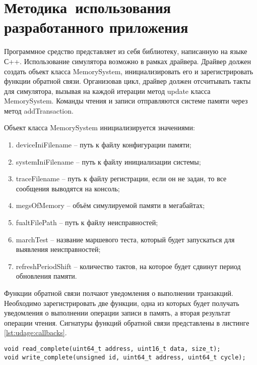 \section{Методика~использования\\ разработанного приложения}
\label{sec:usage}

Программное средство представляет из себя библиотеку, написанную на языке С++. Использование симулятора возможно в рамках драйвера. Драйвер должен создать объект класса MemorySystem, инициализировать его и зарегистрировать функции обратной связи. Организовав цикл, драйвер должен отсчитывать такты для симулятора, вызывая на каждой итерации метод update класса MemorySystem. Команды чтения и записи отправляются системе памяти через метод addTransaction.

Объект класса MemorySystem инициализируется значениями:

\begin{enumerate}
\item deviceIniFilename -- путь к файлу конфигурации памяти;
\item systemIniFilename -- путь к файлу инициализации системы;
\item traceFilename -- путь к файлу регистрации, если он не задан, то все сообщения выводятся на консоль;
\item megsOfMemory -- объём симулируемой памяти в мегабайтах;
\item fualtFilePath -- путь к файлу неисправностей;
\item marchTest -- название маршевого теста, который будет запускаться для выявления неисправностей;
\item refreshPeriodShift -- количество тактов, на которое будет сдвинут период обновления памяти.
\end{enumerate}

Функции обратной связи полчают уведомления о выполнении транзакций. Необходимо зарегистрировать две функции, одна из которых будет получать уведомления о выполнении операции записи в память, а вторая результат операции чтения. Сигнатуры функций обратной связи представлены в листинге \ref{lst:udage:callbacks}.

\begin{lstlisting}[style=cplusplusstyle, caption={Сигнатуры функций обратного вызова}, label=lst:udage:callbacks]
void read_complete(uint64_t address, uint16_t data, size_t);
void write_complete(unsigned id, uint64_t address, uint64_t cycle);
\end{lstlisting}

